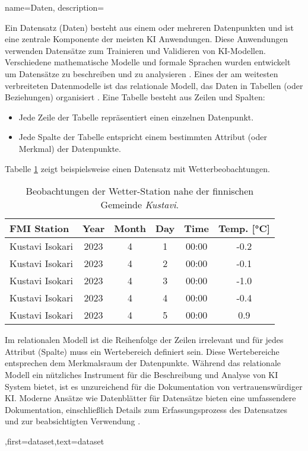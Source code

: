 

{name={Daten},
	description={Ein Datensatz (Daten) besteht aus einem oder mehreren Datenpunkten 
		und ist eine zentrale Komponente der meisten KI Anwendungen. Diese Anwendungen 
		verwenden Datensätze zum Trainieren und Validieren von KI-Modellen. Verschiedene 
		mathematische Modelle und formale Sprachen wurden entwickelt um Datensätze 
		zu beschreiben und zu analysieren \cite{silberschatz2019database,abiteboul1995foundations,hoberman2009data,ramakrishnan2002database}.  
		Eines der am weitesten verbreiteten Datenmodelle ist das relationale Modell, das 
		Daten in Tabellen (oder Beziehungen) organisiert \cite{silberschatz2019database}.
		Eine Tabelle besteht aus Zeilen und Spalten:
		\begin{itemize} 
			\item Jede Zeile der Tabelle repräsentiert einen einzelnen Datenpunkt.
			\item Jede Spalte der Tabelle entspricht einem bestimmten Attribut (oder Merkmal) der 
			Datenpunkte. 
		\end{itemize}
		Tabelle \ref{tab:temperature} zeigt beispielsweise einen Datensatz mit Wetterbeobachtungen.
		\begin{table}[ht]
			\centering
			\begin{tabular}{|l|c|c|c|c|c|}
				\hline
				\textbf{FMI Station} & \textbf{Year} & \textbf{Month} & \textbf{Day} & \textbf{Time} & \textbf{Temp. [°C]} \\ 
				\hline
				Kustavi Isokari & 2023 & 4 & 1 & 00:00 & -0.2 \\ \hline
				Kustavi Isokari & 2023 & 4 & 2 & 00:00 & -0.1 \\ \hline
				Kustavi Isokari & 2023 & 4 & 3 & 00:00 & -1.0 \\ \hline
				Kustavi Isokari & 2023 & 4 & 4 & 00:00 & -0.4 \\ \hline
				Kustavi Isokari & 2023 & 4 & 5 & 00:00 & 0.9 \\ \hline
			\end{tabular}
			\caption{Beobachtungen der Wetter-Station nahe der finnischen Gemeinde \emph{Kustavi}.}
			\label{tab:temperature}
		\end{table}
		Im relationalen Modell ist die Reihenfolge der Zeilen irrelevant und für 
		jedes Attribut (Spalte) muss ein Wertebereich definiert sein. Diese Wertebereiche 
		entsprechen dem Merkmalsraum der Datenpunkte. Während das relationale Modell
		ein nützliches Instrument für die Beschreibung und Analyse von KI System bietet, ist 
		es unzureichend für die Dokumentation von vertrauenswürdiger KI. Moderne Ansätze wie
		Datenblätter für Datensätze bieten eine umfassendere Dokumentation, einschließlich Details 
		zum Erfassungsprozess des Datensatzes und zur beabsichtigten Verwendung \cite{DatasheetData2021}.},first={dataset},text={dataset}  
}





